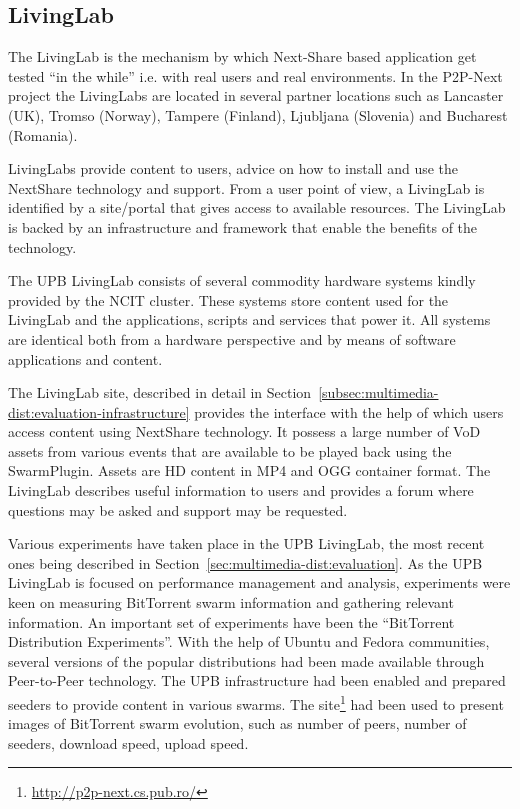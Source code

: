 \subsection{LivingLab}
\label{subsec:multimedia-dist:nextshare-ll}

The LivingLab is the mechanism by which Next-Share based application get
tested ``in the while'' i.e. with real users and real environments. In the
P2P-Next project the LivingLabs are located in several partner locations such
as Lancaster (UK), Tromso (Norway), Tampere (Finland), Ljubljana (Slovenia)
and Bucharest (Romania).

LivingLabs provide content to users, advice on how to install and use the
NextShare technology and support. From a user point of view, a LivingLab is
identified by a site/portal that gives access to available resources. The
LivingLab is backed by an infrastructure and framework that enable the
benefits of the technology.

The UPB LivingLab consists of several commodity hardware systems kindly
provided by the NCIT cluster. These systems store content used for the
LivingLab and the applications, scripts and services that power it. All
systems are identical both from a hardware perspective and by means of
software applications and content.

The LivingLab site, described in detail in
Section~\ref{subsec:multimedia-dist:evaluation-infrastructure} provides the
interface with the help of which users access content using NextShare
technology. It possess a large number of VoD assets from various events that
are available to be played back using the SwarmPlugin. Assets are HD content
in MP4 and OGG container format. The LivingLab describes useful information to
users and provides a forum where questions may be asked and support may be
requested.

Various experiments have taken place in the UPB LivingLab, the most recent
ones being described in Section~\ref{sec:multimedia-dist:evaluation}. As the
UPB LivingLab is focused on performance management and analysis, experiments
were keen on measuring BitTorrent swarm information and gathering relevant
information. An important set of experiments have been the ``BitTorrent
Distribution Experiments''. With the help of Ubuntu and Fedora communities,
several versions of the popular distributions had been made available through
Peer-to-Peer technology. The UPB infrastructure had been enabled and prepared
seeders to provide content in various swarms. The
site\footnote{\url{http://p2p-next.cs.pub.ro/}} had been used to present images of
BitTorrent swarm evolution, such as number of peers, number of seeders,
download speed, upload speed.

